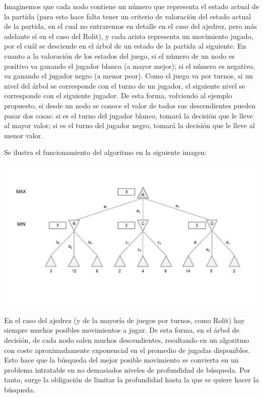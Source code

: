 \documentclass[../DocumentoOficial.tex]{subfiles}
\begin{document}
Imaginemos que cada nodo contiene un número que representa el estado actual de la partida (para esto hace falta tener un criterio de valoración del estado actual de la partida, en el cual no entraremos en detalle en el caso del ajedrez, pero más adelante sí en el caso del Rolit), y cada arista representa un movimiento jugado, por el cuál se desciende en el árbol de un estado de la partida al siguiente. En cuanto a la valoración de los estados del juego, si el número de un nodo es positivo va ganando el jugador blanco (a mayor mejor); si el número es negativo, va ganando el jugador negro (a menor peor). Como el juego va por turnos, si un nivel del árbol se corresponde con el turno de un jugador, el siguiente nivel se corresponde con el siguiente jugador. De esta forma, volviendo al ejemplo propuesto, si desde un nodo se conoce el valor de todos sus descendientes pueden pasar dos cosas: si es el turno del jugador blanco, tomará la decisión que le lleve al mayor valor; si es el turno del jugador negro, tomará la decisión que le lleve al menor valor. 

Se ilustra el funcionamiento del algoritmo en la siguiente imagen: 

\begin{center}
\includegraphics[scale=0.4]{minimaxExample.jpg}
\end{center}

En el caso del ajedrez (y de la mayoría de juegos por turnos, como Rolit) hay siempre muchos posibles movimientos a jugar. De esta forma, en el árbol de decisión, de cada nodo salen muchos descendientes, resultando en un algoritmo con coste aproximadamente exponencial en el promedio de jugadas disponibles. Esto hace que la búsqueda del mejor posible movimiento se convierta en un problema intratable en no demasiados niveles de profundidad de búsqueda. Por tanto, surge la obligación de limitar la profundidad hasta la que se quiere hacer la búsqueda.
\end{document}
